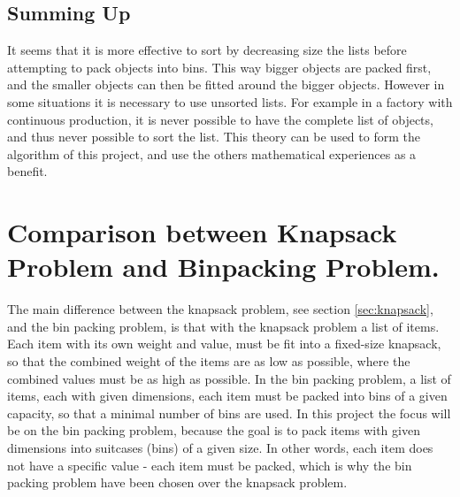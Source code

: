 \subsection{Summing Up}
It seems that it is more effective to sort by decreasing size the lists before attempting to pack objects into bins. This way bigger objects are packed first, and the smaller objects can then be fitted around the bigger objects. However in some situations it is necessary to use unsorted lists. For example in a factory with continuous production, it is never possible to have the complete list of objects, and thus never possible to sort the list. This theory can be used to form the algorithm of this project, and use the others mathematical experiences as a benefit.
\section{Comparison between Knapsack Problem and Binpacking Problem.}
The main difference between the knapsack problem, see section \ref{sec:knapsack}, and the bin packing problem, is that with the knapsack problem a list of items. Each item with its own weight and value, must be fit into a fixed-size knapsack, so that the combined weight of the items are as low as possible, where the combined values must be as high as possible. In the bin packing problem, a list of items, each with given dimensions, each item must be packed into bins of a given capacity, so that a minimal number of bins are used. In this project the focus will be on the bin packing problem, because the goal is to pack items with given dimensions into suitcases (bins) of a given size. In other words, each item does not have a specific value - each item must be packed, which is why the bin packing problem have been chosen over the knapsack problem.